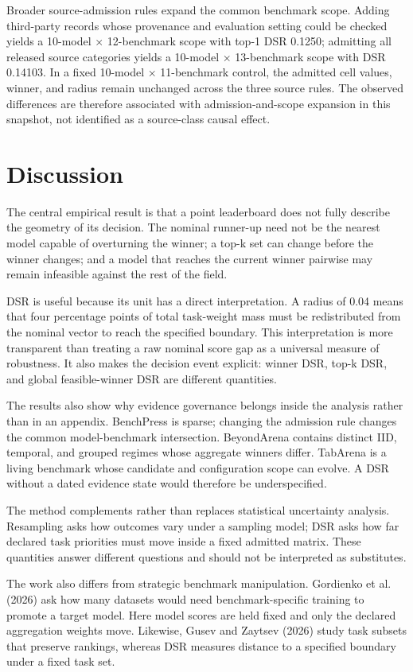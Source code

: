 \documentclass[11pt]{article}
\begin{document}
Broader source-admission rules expand the common benchmark scope. Adding third-party records whose provenance and evaluation setting could be checked yields a 10-model × 12-benchmark scope with top-1 DSR 0.1250; admitting all released source categories yields a 10-model × 13-benchmark scope with DSR 0.14103. In a fixed 10-model × 11-benchmark control, the admitted cell values, winner, and radius remain unchanged across the three source rules. The observed differences are therefore associated with admission-and-scope expansion in this snapshot, not identified as a source-class causal effect.

\section{Discussion}

The central empirical result is that a point leaderboard does not fully describe the geometry of its decision. The nominal runner-up need not be the nearest model capable of overturning the winner; a top-k set can change before the winner changes; and a model that reaches the current winner pairwise may remain infeasible against the rest of the field.

DSR is useful because its unit has a direct interpretation. A radius of 0.04 means that four percentage points of total task-weight mass must be redistributed from the nominal vector to reach the specified boundary. This interpretation is more transparent than treating a raw nominal score gap as a universal measure of robustness. It also makes the decision event explicit: winner DSR, top-k DSR, and global feasible-winner DSR are different quantities.

The results also show why evidence governance belongs inside the analysis rather than in an appendix. BenchPress is sparse; changing the admission rule changes the common model-benchmark intersection. BeyondArena contains distinct IID, temporal, and grouped regimes whose aggregate winners differ. TabArena is a living benchmark whose candidate and configuration scope can evolve. A DSR without a dated evidence state would therefore be underspecified.

The method complements rather than replaces statistical uncertainty analysis. Resampling asks how outcomes vary under a sampling model; DSR asks how far declared task priorities must move inside a fixed admitted matrix. These quantities answer different questions and should not be interpreted as substitutes.

The work also differs from strategic benchmark manipulation. Gordienko et al. (2026) ask how many datasets would need benchmark-specific training to promote a target model. Here model scores are held fixed and only the declared aggregation weights move. Likewise, Gusev and Zaytsev (2026) study task subsets that preserve rankings, whereas DSR measures distance to a specified boundary under a fixed task set.
\end{document}
